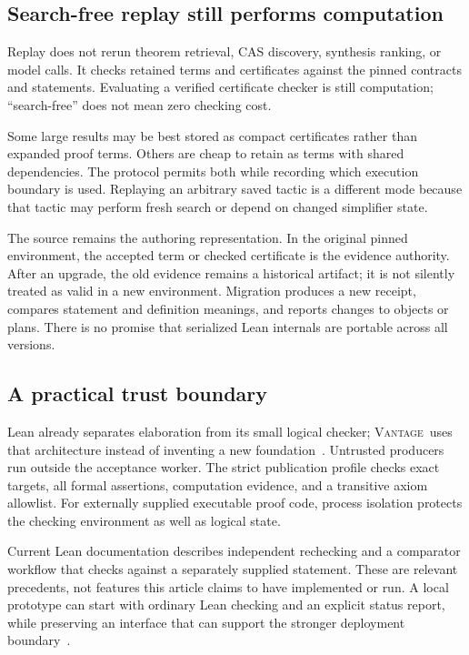 \documentclass[11pt,a4paper]{article}
\newcommand{\Vantage}{\textsc{Vantage}}
\theoremstyle{definition}
\begin{document}
\subsection{Search-free replay still performs computation}
Replay does not rerun theorem retrieval, CAS discovery, synthesis ranking, or
model calls. It checks retained terms and certificates against the pinned
contracts and statements. Evaluating a verified certificate checker is still
computation; ``search-free'' does not mean zero checking cost.

Some large results may be best stored as compact certificates rather than
expanded proof terms. Others are cheap to retain as terms with shared dependencies.
The protocol permits both while recording which execution boundary is used.
Replaying an arbitrary saved tactic is a different mode because that tactic may
perform fresh search or depend on changed simplifier state.

The source remains the authoring representation. In the original pinned
environment, the accepted term or checked certificate is the evidence authority.
After an upgrade, the old evidence remains a historical artifact; it is not
silently treated as valid in a new environment. Migration produces a new receipt,
compares statement and definition meanings, and reports changes to objects or
plans. There is no promise that serialized Lean internals are portable across
all versions.

\subsection{A practical trust boundary}
Lean already separates elaboration from its small logical checker; \Vantage\ uses
that architecture instead of inventing a new foundation~\cite{lean-elab}.
Untrusted producers run outside the acceptance worker. The strict publication
profile checks exact targets, all formal assertions, computation evidence, and
a transitive axiom allowlist. For externally supplied executable proof code,
process isolation protects the checking environment as well as logical state.

Current Lean documentation describes independent rechecking and a comparator
workflow that checks against a separately supplied statement. These are relevant
precedents, not features this article claims to have implemented or run.
A local prototype can start with ordinary Lean checking and an explicit status
report, while preserving an interface that can support the stronger deployment
boundary~\cite{lean-validation}.
\end{document}
